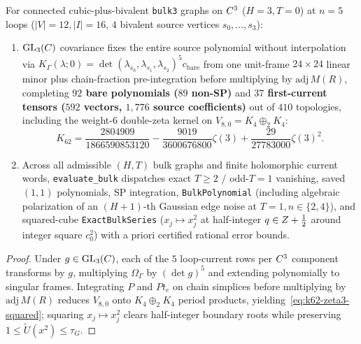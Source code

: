 \begin{theorem}
\label{thm:bulk3-five-loop}
For connected cubic-plus-bivalent \texttt{bulk3} graphs on $C^3$ ($H=3, T=0$) at $n=5$ loops ($|V|=12, |I|=16$, $4$ bivalent source vertices $s_0,\dots,s_3$):
\begin{enumerate}[label=(\arabic*),leftmargin=*]
  \item $\operatorname{GL}_3(C)$ covariance fixes the entire source polynomial without interpolation via $K_\Gamma(\lambda;0) = \det(\lambda_{s_0},\lambda_{s_1},\lambda_{s_2})^5 c_{\mathrm{bare}}$ from one unit-frame $24\times 24$ linear minor plus chain-fraction pre-integration before multiplying by $\mathrm{adj}\,M(R)$, completing \textbf{$92$ bare polynomials ($89$ non-SP)} and \textbf{$37$ first-current tensors ($592$ vectors, $1{,}776$ source coefficients)} out of $410$ topologies, including the weight-$6$ double-zeta kernel on $V_{8,0} = K_4\oplus_2 K_4$:
  \begin{equation}
  \label{eq:k62-zeta3-squared}
  K_{62} = \frac{2804909}{1866590853120} - \frac{9019}{3600676800}\zeta(3) + \frac{29}{27783000}\zeta(3)^2.
  \end{equation}

  \item Across all admissible $(H,T)$ bulk graphs and finite holomorphic current words, \texttt{evaluate\_bulk} dispatches exact $T\ge 2$ / odd-$T=1$ vanishing, saved $(1,1)$ polynomials, SP integration, \texttt{BulkPolynomial} (including algebraic polarization of an $(H+1)$-th Gaussian edge noise at $T=1, n\in\{2,4\}$), and squared-cube \texttt{ExactBulkSeries} ($x_j \mapsto x_j^2$ at half-integer $q \in Z+\frac{1}{2}$ around integer square $c_0^2$) with a priori certified rational error bounds.
\end{enumerate}
\end{theorem}

\begin{proof}
Under $g \in \operatorname{GL}_3(C)$, each of the $5$ loop-current rows per $C^3$ component transforms by $g$, multiplying $\Omega_\Gamma$ by $(\det g)^5$ and extending polynomially to singular frames. Integrating $P$ and $P t_e$ on chain simplices before multiplying by $\mathrm{adj}\,M(R)$ reduces $V_{8,0}$ onto $K_4\oplus_2 K_4$ period products, yielding~\eqref{eq:k62-zeta3-squared}; squaring $x_j \mapsto x_j^2$ clears half-integer boundary roots while preserving $1 \le \widetilde{U}(x^2) \le \tau_G$.
\end{proof}
